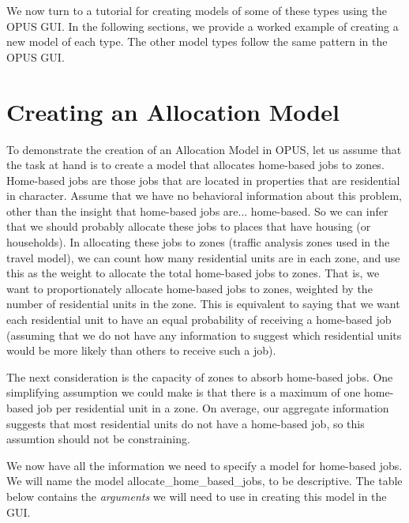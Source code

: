 We now turn to a tutorial for creating models of some of these types using the OPUS GUI.  In the following sections, we provide a worked example of creating a new model of each type.  The other model types follow the same pattern in the OPUS GUI.

\section{Creating an Allocation Model}

To demonstrate the creation of an Allocation Model in OPUS, let us assume that the task at hand is to create a model that allocates home-based jobs to zones.  Home-based jobs are those jobs that are located in properties that are residential in character.  Assume that we have no behavioral information about this problem, other than the insight that home-based jobs are... home-based.  So we can infer that we should probably allocate these jobs to places that have housing (or households).  In allocating these jobs to zones (traffic analysis zones used in the travel model), we can count how many residential units are in each zone, and use this as the weight to allocate the total home-based jobs to zones.  That is, we want to proportionately allocate home-based jobs to zones, weighted by the number of residential units in the zone.  This is equivalent to saying that we want each residential unit to have an equal probability of receiving a home-based job (assuming that we do not have any information to suggest which residential units would be more likely than others to receive such a job).

The next consideration is the capacity of zones to absorb home-based jobs.  One simplifying assumption we could make is that there is a maximum of one home-based job per residential unit in a zone.  On average, our aggregate information suggests that most residential units do not have a home-based job, so this assumtion should not be constraining.

We now have all the information we need to specify a model for home-based jobs.  We will name the model allocate\_home\_based\_jobs, to be descriptive.  The table below contains the \emph{arguments} we will need to use in creating this model in the GUI.

